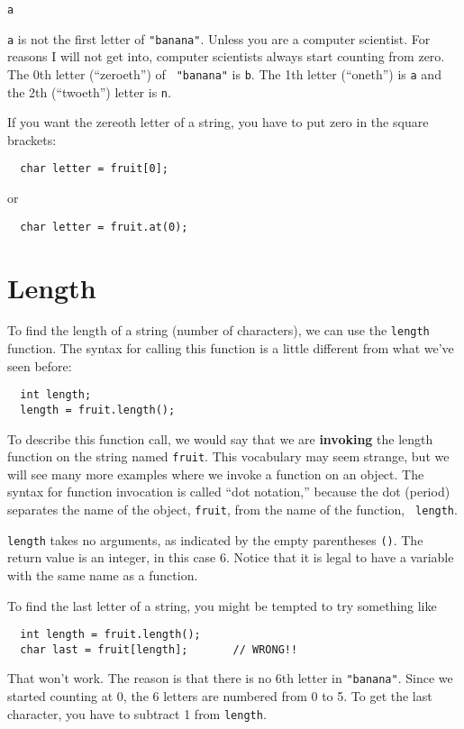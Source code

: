 \begin{verbatim}
a
\end{verbatim}
%
{\tt a} is not the first letter of {\tt "banana"}.  Unless you are a
computer scientist.  For reasons I will not get into, computer scientists always
start counting from zero.  The 0th letter (``zeroeth'') of {\tt
"banana"} is {\tt b}.  The 1th letter (``oneth'') is {\tt a} and the
2th (``twoeth'') letter is {\tt n}.

If you want the zereoth letter of a string, you have to put
zero in the square brackets:

\begin{verbatim}
  char letter = fruit[0];
\end{verbatim}
or
\begin{verbatim}
  char letter = fruit.at(0);
\end{verbatim}

\section{Length}

To find the length of a string (number of characters), we can
use the {\tt length} function.  The syntax for calling this
function is a little different from what we've seen before:

\begin{verbatim}
  int length;
  length = fruit.length();
\end{verbatim}
%
To describe this function call, we would say that we are {\bf
invoking} the length function on the string named {\tt fruit}.  This
vocabulary may seem strange, but we will see many more examples where
we invoke a function on an object.  The syntax for function invocation
is called ``dot notation,'' because the dot (period) separates the
name of the object, {\tt fruit}, from the name of the function, {\tt
length}.

{\tt length} takes no arguments, as indicated by the empty parentheses
{\tt ()}.  The return value is an integer, in this case 6.  Notice
that it is legal to have a variable with the same name as a function.

To find the last letter of a string, you might be tempted to
try something like

\begin{verbatim}
  int length = fruit.length();
  char last = fruit[length];       // WRONG!!
\end{verbatim}
%
That won't work.  The reason is that there is no 6th letter
in {\tt "banana"}.  Since we started counting at 0, the 6
letters are numbered from 0 to 5.  To get the last character,
you have to subtract 1 from {\tt length}.

